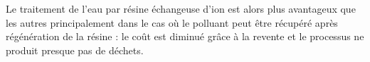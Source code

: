 \documentclass{article}
\begin{document}
Le traitement de l’eau par résine échangeuse d’ion est alors plus avantageux que les autres principalement dans le cas où le polluant peut être récupéré après régénération de la résine : le coût est diminué grâce à la revente et le processus ne produit presque pas de déchets.




\end{document}
